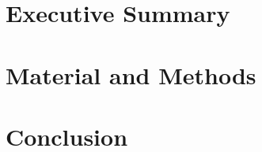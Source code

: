 \documentclass[confidential,unrestrictedsummary]{template/cls/sciliciumreport}
\institute{\JINJAVAR{jj_institute_name}}
\title{\JINJAVAR{jj_report_title}}
\subtitle{\JINJAVAR{jj_report_subtitle}}
\author{\JINJAVAR{jj_report_author}}
\newcommand{\JINJAVAR}[1]{}
\newcommand{\JINJABLOCK}[1]{}
\begin{document}
\JINJABLOCK{if jj_first_page_type == 'simple'}
\frontmattersimple
\JINJABLOCK{elif jj_first_page_type == 'cover'}
\frontmattercover
\JINJABLOCK{else}
\frontmatter %
\JINJABLOCK{endif}

\JINJABLOCK{if jj_executive_summary}
\clearpage
\section*{Executive Summary}
\JINJAVAR{jj_executive_summary}
\JINJABLOCK{endif}























\hypertarget{materials_methods}{%
\section{Material and Methods}\label{materials_methods}}

\JINJAVAR{jj_materials_methods|subrender}





\JINJAVAR{jj_projects_results}


\JINJAVAR{jj_appendix}

\JINJABLOCK{if jj_conclusion}
\clearpage
\section{Conclusion}
\JINJAVAR{jj_conclusion}
\JINJABLOCK{endif}










\JINJABLOCK{if jj_last_page_type == 'contact'}
\backmattercontact
\JINJABLOCK{else}
\backmatter
\JINJABLOCK{endif}
\end{document}
